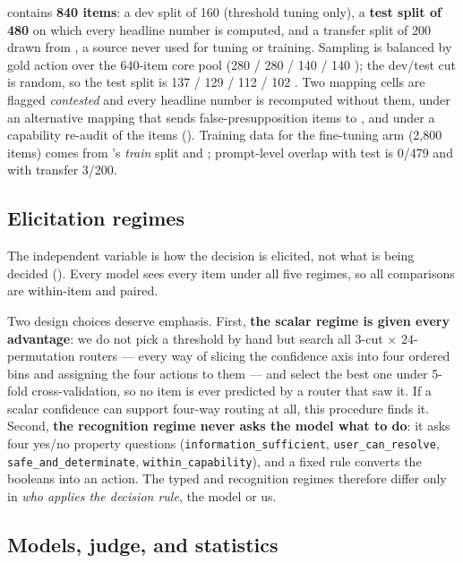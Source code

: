 \carb contains \textbf{840 items}: a dev split of 160 (threshold tuning only), a \textbf{test split
of 480} on which every headline number is computed, and a transfer split of 200 drawn from
\clamber, a source never used for tuning or training. Sampling is balanced by gold action over the
640-item core pool (280 \ask / 280 \act / 140  / 140 ); the dev/test cut is random, so
the test split is 137 \ask / 129 \act / 112  / 102 . Two mapping cells are flagged
\emph{contested} and every headline number is recomputed without them, under an alternative mapping
that sends false-presupposition items to , and under a capability re-audit of the \inthree
items (). Training data for the fine-tuning arm (2,800 items) comes from
\coconot's \emph{train} split and \ambigqa \citep{min2020ambigqa}; prompt-level overlap with test is 0/479 and with
transfer 3/200.

\subsection{Elicitation regimes}

The independent variable is how the decision is elicited, not what is being decided
(). Every model sees every item under all five regimes, so all comparisons are
within-item and paired.



Two design choices deserve emphasis. First, \textbf{the scalar regime is given every advantage}:
we do not pick a threshold by hand but search all $3$-cut $\times$ $24$-permutation routers ---
every way of slicing the confidence axis into four ordered bins and assigning the four actions to
them --- and select the best one under 5-fold cross-validation, so no item is ever predicted by a
router that saw it. If a scalar confidence can support four-way routing at all, this procedure
finds it. Second, \textbf{the recognition regime never asks the model what to do}: it asks four
yes/no property questions (\texttt{information\_sufficient}, \texttt{user\_can\_resolve},
\texttt{safe\_and\_determinate}, \texttt{within\_capability}), and a fixed rule converts the
booleans into an action. The typed and recognition regimes therefore differ only in \emph{who
applies the decision rule}, the model or us.

\subsection{Models, judge, and statistics}

